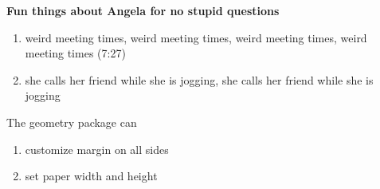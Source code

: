 \documentclass[11pt]{article}
\begin{document}
\textbf{Fun things about Angela for no stupid questions}

\begin{enumerate}
\item weird meeting times, weird meeting times, weird meeting times, weird meeting times (7:27)
\item she calls her friend while she is jogging, she calls her friend while she is jogging
\end{enumerate}

The geometry package can 
\begin{enumerate}
\item customize margin on all sides
\item set paper width and height
\end{enumerate}
\end{document}
